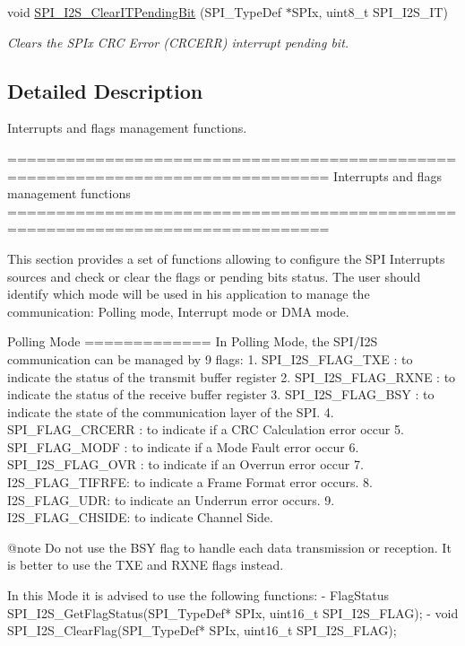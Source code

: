 \begin{DoxyCompactItemize}
void \hyperlink{group___s_p_i___group5_ga35a524a49ff3d058137060f751e8749f}{S\-P\-I\-\_\-\-I2\-S\-\_\-\-Clear\-I\-T\-Pending\-Bit} (S\-P\-I\-\_\-\-Type\-Def $\ast$S\-P\-Ix, uint8\-\_\-t S\-P\-I\-\_\-\-I2\-S\-\_\-\-I\-T)
\begin{DoxyCompactList}\small\item\em Clears the S\-P\-Ix C\-R\-C Error (C\-R\-C\-E\-R\-R) interrupt pending bit. \end{DoxyCompactList}\end{DoxyCompactItemize}


\subsection{Detailed Description}
Interrupts and flags management functions. \begin{DoxyVerb} ===============================================================================
                         Interrupts and flags management functions
 ===============================================================================  

  This section provides a set of functions allowing to configure the SPI Interrupts 
  sources and check or clear the flags or pending bits status.
  The user should identify which mode will be used in his application to manage 
  the communication: Polling mode, Interrupt mode or DMA mode. 
    
  Polling Mode
  =============
  In Polling Mode, the SPI/I2S communication can be managed by 9 flags:
     1. SPI_I2S_FLAG_TXE : to indicate the status of the transmit buffer register
     2. SPI_I2S_FLAG_RXNE : to indicate the status of the receive buffer register
     3. SPI_I2S_FLAG_BSY : to indicate the state of the communication layer of the SPI.
     4. SPI_FLAG_CRCERR : to indicate if a CRC Calculation error occur              
     5. SPI_FLAG_MODF : to indicate if a Mode Fault error occur
     6. SPI_I2S_FLAG_OVR : to indicate if an Overrun error occur
     7. I2S_FLAG_TIFRFE: to indicate a Frame Format error occurs.
     8. I2S_FLAG_UDR: to indicate an Underrun error occurs.
     9. I2S_FLAG_CHSIDE: to indicate Channel Side.

@note Do not use the BSY flag to handle each data transmission or reception.  It is
      better to use the TXE and RXNE flags instead.

  In this Mode it is advised to use the following functions:
     - FlagStatus SPI_I2S_GetFlagStatus(SPI_TypeDef* SPIx, uint16_t SPI_I2S_FLAG);
     - void SPI_I2S_ClearFlag(SPI_TypeDef* SPIx, uint16_t SPI_I2S_FLAG);


\end{DoxyVerb}
